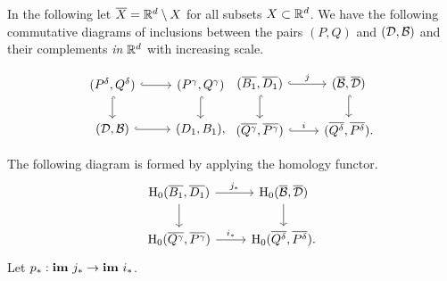 
In the following let $\overline{X} = \mathbb{R}^d\setminus X$ for all subsets $X\subset\mathbb{R}^d$.
We have the following commutative diagrams of inclusions between the pairs $(P,Q)$ and $({\mathcal{D}}, {\mathcal{B}})$ and their complements \emph{in $\mathbb{R}^d$} with increasing scale.

\[ \begin{tikzcd}
  (P^\delta, Q^\delta) \arrow[hookrightarrow]{r}\arrow[hookrightarrow]{d} &
  (P^\gamma, Q^\gamma) \arrow[hookrightarrow]{d} \\
  (\D, \B) \arrow[hookrightarrow]{r} &
  (D_1, B_1),
\end{tikzcd}\begin{tikzcd}
  (\overline{B_1}, \overline{D_1})\arrow[hookrightarrow]{r}{j}\arrow[hookrightarrow]{d} &
  (\overline{\B}, \overline{\D}) \arrow[hookrightarrow]{d}\\
  (\overline{Q^\gamma}, \overline{P^\gamma}) \arrow[hookrightarrow]{r}{i} &
  (\overline{Q^\delta}, \overline{P^\delta}).
\end{tikzcd}\]

The following diagram is formed by applying the homology functor.
\begin{equation}\label{dgm:1}\begin{tikzcd}
    \hom_0(\overline{B_1}, \overline{D_1})\arrow{r}{j_*}\arrow{d} &
    \hom_0(\overline{\B}, \overline{\D}) \arrow{d} \\
    \hom_0(\overline{Q^\gamma}, \overline{P^\gamma}) \arrow{r}{i_*} &
    \hom_0(\overline{Q^\delta}, \overline{P^\delta}).
\end{tikzcd}\end{equation}
Let $p_* : \mathbf{im}~j_*\to\mathbf{im}~i_*$.

